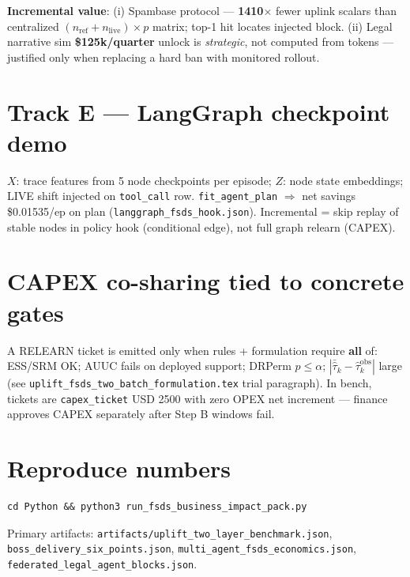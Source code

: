 \documentclass[11pt]{article}
\begin{document}
\textbf{Incremental value}: (i) Spambase protocol --- \textbf{1410$\times$} fewer uplink scalars than centralized $(n_{\mathrm{ref}}+n_{\mathrm{live}})\times p$ matrix; top-1 hit locates injected block. (ii) Legal narrative sim \textbf{\$125k/quarter} unlock is \emph{strategic}, not computed from tokens --- justified only when replacing a hard ban with monitored rollout.

\section{Track E --- LangGraph checkpoint demo}

\textbf{$X$}: trace features from 5 node checkpoints per episode; \textbf{$Z$}: node state embeddings; LIVE shift injected on \texttt{tool\_call} row. \texttt{fit\_agent\_plan} $\Rightarrow$ net savings \$0.01535/ep on plan (\texttt{langgraph\_fsds\_hook.json}). Incremental = skip replay of stable nodes in policy hook (conditional edge), not full graph relearn (CAPEX).

\section{CAPEX co-sharing tied to concrete gates}
A RELEARN ticket is emitted only when rules + formulation require \textbf{all} of: ESS/SRM OK; AUUC fails on deployed support; DRPerm $p\le\alpha$; $|\bar{\hat\tau}_k-\widehat{\tau}^{\mathrm{obs}}_k|$ large (see \texttt{uplift\_fsds\_two\_batch\_formulation.tex} trial paragraph). In bench, tickets are \texttt{capex\_ticket} USD 2500 with zero OPEX net increment --- finance approves CAPEX separately after Step B windows fail.

\section{Reproduce numbers}
\begin{verbatim}
cd Python && python3 run_fsds_business_impact_pack.py
\end{verbatim}
Primary artifacts: \texttt{artifacts/uplift\_two\_layer\_benchmark.json}, \texttt{boss\_delivery\_six\_points.json}, \texttt{multi\_agent\_fsds\_economics.json}, \texttt{federated\_legal\_agent\_blocks.json}.
\end{document}
